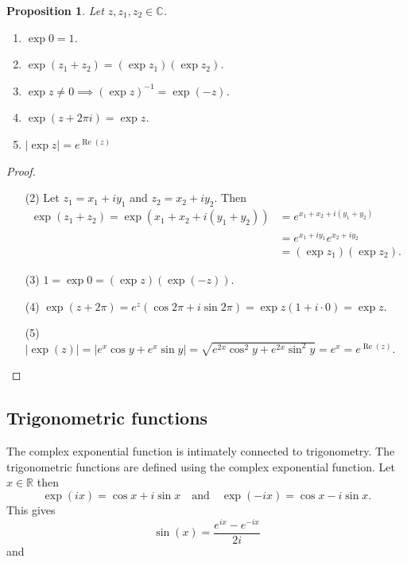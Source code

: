 \documentclass[12pt,openany]{book}
\newtheorem{proposition}[theorem]{Proposition}
\theoremstyle{definition}
\newcommand{\R}{\mathbb{R}}
\newcommand{\C}{\mathbb{C}}
\newcommand{\of}[1]{\left( #1 \right)}
\newcommand{\abs}[1]{\left\lvert #1 \right\rvert}
\newcommand{\inv}[1]{{#1}^{-1}}
\renewcommand{\Re}{\operatorname{Re}}
\begin{document}
	\begin{tcolorbox}[colback=white,colframe=procolor,arc=5pt,title={\color{white}\bf Properties of Complex Expoenential}]
		\begin{proposition}
			Let $z,z_1,z_2\in\C$. \begin{enumerate}[(1)]
				\item $\exp 0 = 1$.
				\item $\exp\of{z_1+z_2}=(\exp z_1)(\exp z_2)$.
				\item $\exp z\neq 0\implies\inv{\of{\exp z}}=\exp(-z)$.
				\item $\exp(z+2\pi i)=\exp z$.
				\item $\abs{\exp z}=e^{\Re\of{z}}$
			\end{enumerate}
		\end{proposition}
	\end{tcolorbox}
	\begin{proof}
		\begin{itemize}
			\item[(2)] Let $z_1=x_1+iy_1$ and $z_2=x_2+iy_2$. Then \begin{align*}
			\exp\of{z_1+z_2}=\exp\of{x_1+x_2+i(y_1+y_2)}&=e^{x_1+x_2+i(y_1+y_2)}\\
			&=e^{x_1+iy_1}e^{x_2+iy_2}\\
			&=\of{\exp z_1}\of{\exp z_2}.
			\end{align*}
			\item[(3)] $1=\exp 0=\of{\exp z}\of{\exp (-z)}$.
			\item[(4)] $\exp (z+2\pi)=e^z\of{\cos 2\pi+i\sin 2\pi}=\exp z(1+i\cdot 0)=\exp z$.
			\item[(5)] $\abs{\exp\of{z}}=\abs{e^x\cos y+e^x\sin y}=\sqrt{e^{2x}\cos^2y+e^{2x}\sin^2y}=e^x=e^{\Re\of{z}}$.
		\end{itemize}
	\end{proof}
	
	\newpage
	\subsection{Trigonometric functions}
	The complex exponential function is intimately connected to trigonometry. The trigonometric functions are defined using the complex exponential function. Let $x\in\R$ then \[
	\exp\of{ix}=\cos x+i\sin x\quad\text{and}\quad\exp\of{-ix}=\cos x-i\sin x.
	\] This gives
	\begin{equation*}
	\sin(x) = \frac{e^{ix} - e^{-ix}}{2i}
	\end{equation*} and
	
\end{document}
